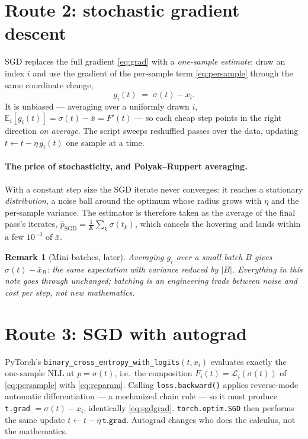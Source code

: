 \documentclass[11pt]{article}
\newtheorem{remark}{Remark}
\newcommand{\sigmoid}{\sigma}
\newcommand{\xbar}{\bar{x}}
\begin{document}
\section{Route 2: stochastic gradient descent}

SGD replaces the full gradient \eqref{eq:grad} with a \emph{one-sample
estimate}: draw an index $i$ and use the gradient of the per-sample term
\eqref{eq:persample} through the same coordinate change,
\begin{equation}
  g_i(t) \;=\; \sigmoid(t) - x_i .
  \label{eq:sgdgrad}
\end{equation}
It is unbiased --- averaging over a uniformly drawn $i$,
$\mathbb{E}_i\!\left[g_i(t)\right] = \sigmoid(t) - \xbar = F'(t)$ --- so
each cheap step points in the right direction \emph{on average}. The
script sweeps reshuffled passes over the data, updating
$t \leftarrow t - \eta\, g_i(t)$ one sample at a time.

\paragraph{The price of stochasticity, and Polyak--Ruppert averaging.}
With a constant step size the SGD iterate never converges: it reaches a
stationary \emph{distribution}, a noise ball around the optimum whose
radius grows with $\eta$ and the per-sample variance. The estimator is
therefore taken as the average of the final pass's iterates,
$\hat{p}_{\mathrm{SGD}} = \tfrac1K \sum_k \sigmoid(t_k)$, which cancels
the hovering and lands within a few $10^{-3}$ of $\xbar$.

\begin{remark}[Mini-batches, later]
Averaging $g_i$ over a small batch $B$ gives $\sigmoid(t)-\xbar_B$: the
same expectation with variance reduced by $|B|$. Everything in this note
goes through unchanged; batching is an engineering trade between noise
and cost per step, not new mathematics.
\end{remark}

\section{Route 3: SGD with autograd}

PyTorch's \texttt{binary\_cross\_entropy\_with\_logits}$(t, x_i)$
evaluates exactly the one-sample NLL at $p = \sigmoid(t)$, i.e.\ the
composition $F_i(t) = \mathcal{L}_i(\sigmoid(t))$ of
\eqref{eq:persample} with \eqref{eq:reparam}. Calling
\texttt{loss.backward()} applies reverse-mode automatic differentiation
--- a mechanized chain rule --- so it must produce \texttt{t.grad}
$= \sigmoid(t) - x_i$, identically \eqref{eq:sgdgrad}.
\texttt{torch.optim.SGD} then performs the same update
$t \leftarrow t - \eta\,\texttt{t.grad}$. Autograd changes who does the
calculus, not the mathematics.
\end{document}
